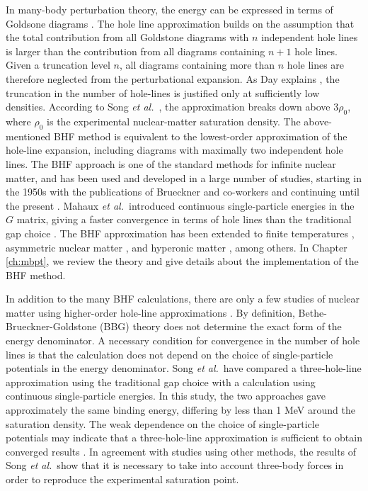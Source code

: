 \documentclass[a4paper,12pt]{report}
\begin{document}
In many-body perturbation theory, the energy can be 
expressed in terms of Goldsone diagrams \cite{bartlett_book}. 
The hole line approximation \cite{day1967,day1978} builds on 
the assumption that the total contribution from all Goldstone 
diagrams with 
$n$ independent hole lines is larger than the  
contribution from all diagrams containing $n+1$ hole lines. 
Given a truncation level $n$, all diagrams containing more
than $n$ hole lines are therefore neglected from the 
perturbational expansion. As Day explains \cite{day1967}, 
the truncation in the number of hole-lines is justified only 
at sufficiently low densities. According to Song 
\emph{et al.}~\cite{song}, the approximation breaks down 
above $3\rho_{0}$, where $\rho_{0}$ is the experimental 
nuclear-matter saturation density. The above-mentioned 
BHF method is equivalent to the 
lowest-order approximation of the hole-line expansion,
including diagrams with maximally two independent hole
lines. The BHF approach is one of the standard 
methods for infinite nuclear matter, and has been
used and developed in a large number of studies, starting 
in the 1950s with the publications of Brueckner and 
co-workers \cite{brueckner1954,brueckner_levinson,brueckner,
brueckner_gammel} and continuing until the present
\cite{day1967,haftel_tabakin,bethe1971,day1978,
jackson1983,mahaux1985,lejeune1986,mahaux1989,baldo1990,
engvik1996,engvik1997,song,schiller,vidana2000,suzuki,
zuo2002,zuo2003,li2006,burgio2008,vidana2011,inoue2013}.   
Mahaux \emph{et al.}~introduced continuous single-particle
energies \cite{mahaux1985,mahaux1989} in the $G$ matrix, 
giving a faster convergence \cite{baldo1990,song} in terms 
of hole lines than the traditional gap choice 
\cite{haftel_tabakin}. 
The BHF approximation has been extended to finite temperatures 
\cite{lejeune1986,zuo2003}, asymmetric nuclear matter
\cite{bombaci1991,engvik1996,zuo2002a}, and hyperonic 
matter \cite{schulze1998,vidana2000}, among others.
In Chapter \ref{ch:mbpt}, we review the theory and 
give details about the implementation of the BHF method.

In addition to the many BHF calculations, there are only 
a few studies of nuclear matter using higher-order 
hole-line approximations \cite{day1981,song1997,song}.     
By definition, Bethe-Brueckner-Goldstone (BBG) theory 
\cite{day1967,raja,day1978}
does not determine the exact form of the energy denominator. 
A necessary condition for convergence in the number of
hole lines is that the calculation does not depend on 
the choice of single-particle potentials in the energy
denominator. Song \emph{et al.}~have compared \cite{song} 
a three-hole-line approximation using the traditional
gap choice with a calculation using continuous 
single-particle energies. In this study, the two approaches 
gave approximately the same binding energy, differing by
less than 1 MeV around the saturation density. The weak
dependence on the choice of single-particle potentials
may indicate that a three-hole-line approximation is 
sufficient to obtain converged results \cite{song}.
In agreement with studies using other methods, 
the results of Song \emph{et al.}~show that it is 
necessary to take into account three-body forces in 
order to reproduce the experimental saturation point.
\end{document}
